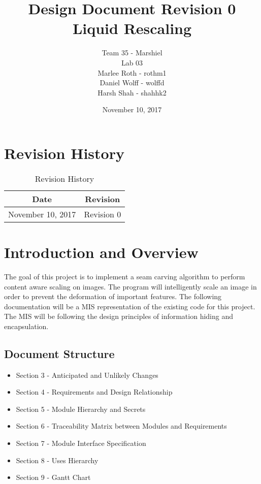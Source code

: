 \documentclass{article}
\title{\bf{Design Document Revision 0}\\
\bf{Liquid Rescaling}}
\author{Team 35 - Marshiel \\
Lab 03\\
Marlee Roth - rothm1\\
Daniel Wolff - wolffd\\
Harsh Shah - shahhk2}
\date{November 10, 2017}
\begin{document}
\maketitle

\newpage
\tableofcontents

\listoftables 

\newpage

\section{Revision History}
\begin{table}[h!]
\centering
\caption{Revision History}
\begin{tabular}{| c | c |}
\hline Date & Revision  \\
\hline November 10, 2017 & Revision 0 \\
\hline
\end{tabular}
\end{table}


\section{Introduction and Overview}
The goal of this project is to implement a seam carving algorithm to perform content aware scaling on images. The program will intelligently scale an image in order to prevent the deformation of important features. The following documentation will be a MIS representation of the existing code for this project. The MIS will be following the design principles of information hiding and encapsulation. 

\subsection{Document Structure}
\begin{itemize}
    \item Section 3 - Anticipated and Unlikely Changes
    \item Section 4 - Requirements and Design Relationship
    \item Section 5 - Module Hierarchy and Secrets
    \item Section 6 - Traceability Matrix between Modules and Requirements
    \item Section 7 - Module Interface Specification
    \item Section 8 - Uses Hierarchy
    \item Section 9 - Gantt Chart
\end{itemize}
\end{document}
